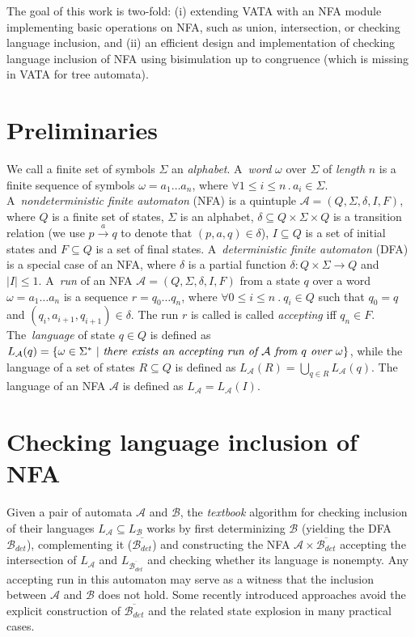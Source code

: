 \documentclass{eeict}
\begin{document}
The goal of this work is two-fold: (i) extending VATA with an NFA module implementing basic operations on NFA, such as union, intersection, or 
checking language inclusion, and (ii) an efficient design and implementation of checking language inclusion of NFA using 
bisimulation up to congruence (which is missing in VATA for tree automata).

\section{Preliminaries}
We call a finite set of symbols $\Sigma$ an \emph{alphabet}. A~\emph{word} $\omega$ over $\Sigma$ of \emph{length} $n$ is a finite sequence of symbols 
$\omega=a_1\ldots a_n$, where $\forall 1 \leq i \leq n\,.\,a_i \in \Sigma$. 
A~\emph{nondeterministic finite automaton} (NFA) is a quintuple $\mathcal{A}= (Q,\Sigma,\delta,I,F)$, 
where $Q$ is a finite set of states, $\Sigma$ is an alphabet, $\delta \subseteq Q\times \Sigma \times Q$
is a transition relation (we use $p \xrightarrow{a} q$ to denote that $(p,a,q) \in \delta$), $I \subseteq Q$ is a set of initial states 
and $F \subseteq Q$ is a set of final states. A~\emph{deterministic finite automaton} (DFA) is a special case of an NFA, 
where $\delta$ is a partial function 
$\delta: Q\times \Sigma \to Q$ and $|I| \leq 1$. A~\emph{run} of an NFA $\mathcal{A}=(Q,\Sigma,\delta,I,F)$ from a state $q$
over a word $\omega=a_1\ldots a_n$ is a sequence $r = q_0 \ldots q_n$, where $\forall 0\leq i \leq n\ .\ q_i\in Q$ 
such that $q_0=q$ and $(q_i,a_{i+1},q_{i+1})\in \delta$. 
The run $r$ is called is called \emph{accepting} iff $q_n \in F$. The~\emph{language} of state $q \in Q$ is defined as 
$L_\mathcal{A}(q) = \{\omega\in \Sigma^{*}\ |\ \emph{there exists an accepting run of }\mathcal{A} 
\emph{ from }q\emph{ over }\omega\}$, while the language of a set of states $R\subseteq Q$ is defined as $L_{\mathcal{A}}(R)=\bigcup_{q\in R}L_{\mathcal{A}}(q)$.
The language of an NFA $\mathcal{A}$ is defined as $L_{\mathcal{A}}=L_{\mathcal{A}}(I)$.

\section{Checking language inclusion of NFA}
Given a pair of automata $\mathcal{A}$ and $\mathcal{B}$,
the \emph{textbook} algorithm for checking inclusion of their languages $L_\mathcal{A}\subseteq L_\mathcal{B}$ works by first 
determinizing $\mathcal{B}$ (yielding the DFA 
$\mathcal{B}_{det}$), 
complementing it ($\overline{\mathcal{B}_{det}}$) and constructing the NFA $\mathcal{A} \times \overline{\mathcal{B}_{det}}$ 
accepting the intersection of $L_{\mathcal{A}}$ and ${L_{\overline{\mathcal{B}_{det}}}}$ and
checking whether its language is nonempty. Any accepting run in this automaton may serve as a witness that the inclusion between $\mathcal{A}$ 
and $\mathcal{B}$ does not hold. 
Some recently introduced approaches avoid the explicit construction of $\overline{\mathcal{B}_{det}}$ and the related state explosion in many practical cases.
\end{document}
